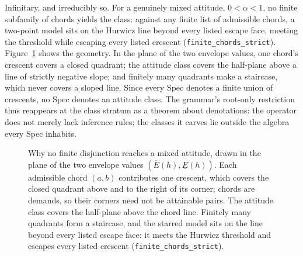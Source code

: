 Infinitary, and irreducibly so. For a genuinely mixed attitude,
$0 < \alpha < 1$, no finite subfamily of chords yields the class:
against any finite list of admissible chords, a two-point model
sits on the Hurwicz line beyond every listed escape face, meeting
the threshold while escaping every listed crescent
(\texttt{finite\_chords\_strict}). Figure~\ref{fig:su-chords}
shows the geometry. In the plane of the two envelope values, one chord's
crescent covers a closed quadrant; the attitude class covers the
half-plane above a line of strictly negative slope; and finitely
many quadrants make a staircase, which never covers a sloped line.
Since every Spec denotes a finite union of crescents, no Spec
denotes an attitude class. The grammar's root-only restriction
thus reappears at the class stratum as a theorem about
denotations: the operator does not merely lack inference rules;
the classes it carves lie outside the algebra every Spec inhabits.

\begin{figure}[t]
\centering
{}
\caption{Why no finite disjunction reaches a mixed attitude,
  drawn in the plane of the two envelope values
  $(\overline{E}(h), \underline{E}(h))$. Each admissible chord
  $(a,b)$ contributes one crescent, which covers the closed
  quadrant above and to the right of its corner; chords are
  demands, so their corners need not be attainable pairs. The
  attitude class covers the half-plane above the chord line.
  Finitely many quadrants form a staircase, and the starred model
  sits on the line beyond every listed escape face: it meets the
  Hurwicz threshold and escapes every listed crescent
  (\texttt{finite\_chords\_strict}).}
\label{fig:su-chords}
\end{figure}


